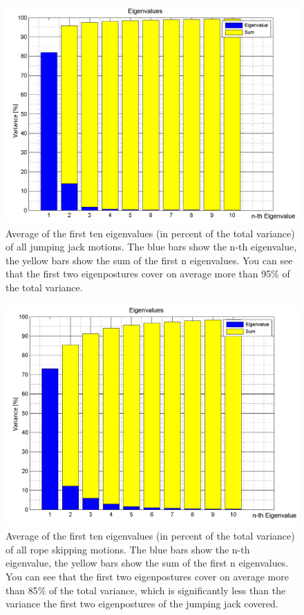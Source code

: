 \documentclass[a4paper]{article}
\begin{document}
\begin{figure}
		\centering
		\includegraphics[width=\textwidth]{DurchschnittHampelmann_eigenwerte.png}
		\caption{Average of the first ten eigenvalues (in percent of the total variance) of all jumping jack motions. The blue bars show the n-th eigenvalue, the yellow bars show the sum of the first n eigenvalues.
		You can see that the first two eigenpostures cover on average more than 95\% of the total variance.}
		\label{fig:jumpingJackAverageEigenvalues}
\end{figure}

\begin{figure}
		\centering
		\includegraphics[width=\textwidth]{DurchschnittSeilhuepfen_eigenwerte.png}
		\caption{Average of the first ten eigenvalues (in percent of the total variance) of all rope skipping motions. The blue bars show the n-th eigenvalue, the yellow bars show the sum of the first n eigenvalues.
		You can see that the first two eigenpostures cover on average more than 85\% of the total variance, which is significantly less than the variance the first two eigenpostures of the jumping jack covered.}
		\label{fig:ropeSkippingAverageEigenvalues}
\end{figure}
\end{document}
